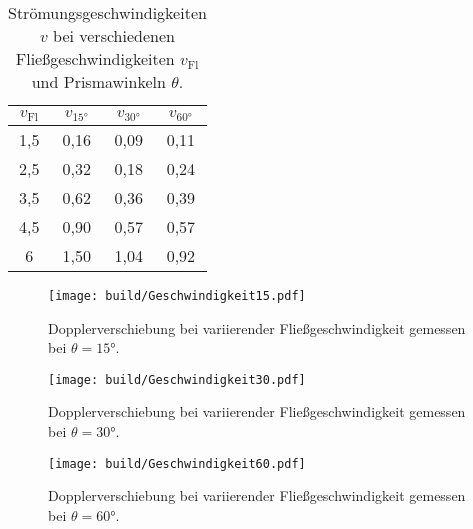 \begin{table}[H]
  \centering
  \caption{Strömungsgeschwindigkeiten $v$ bei verschiedenen Fließgeschwindigkeiten $v_\text{Fl}$ und Prismawinkeln $\theta$.}
  \label{tab:v}
  \begin{tabular}{S[table-format=1.1] S[table-format=1.2] S[table-format=1.2] S[table-format=1.2]}
      \toprule
      {$v_\text{Fl}$}&{$v_\text{15°}$}&{$v_\text{30°}$}&{$v_\text{60°}$}\\
      ,5 & 0,16 & 0,09 & 0,11 \\
      2,5 & 0,32 & 0,18 & 0,24 \\
      3,5 & 0,62 & 0,36 & 0,39 \\
      4,5 & 0,90 & 0,57 & 0,57 \\
      6 & 1,50 & 1,04 & 0,92 \\
      \bottomrule
  \end{tabular}
\end{table}

\begin{figure}[H]
  \centering
  \texttt{[image: build/Geschwindigkeit15.pdf]}
  \caption{Dopplerverschiebung bei variierender Fließgeschwindigkeit gemessen bei $\theta=15°$.}
  \label{fig:v15}
\end{figure}

\begin{figure}[H]
  \centering
  \texttt{[image: build/Geschwindigkeit30.pdf]}
  \caption{Dopplerverschiebung bei variierender Fließgeschwindigkeit gemessen bei $\theta=30°$.}
  \label{fig:v30}
\end{figure}

\begin{figure}[H]
  \centering
  \texttt{[image: build/Geschwindigkeit60.pdf]}
  \caption{Dopplerverschiebung bei variierender Fließgeschwindigkeit gemessen bei $\theta=60°$.}
  \label{fig:v60}
\end{figure}

